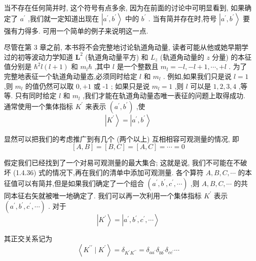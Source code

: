 \documentclass[lang=cn,newtx,10pt,scheme=chinese,thmcnt=section]{elegantbook}
\begin{document}
当不存在任何简并时, 这个符号有点多余, 因为在前面的讨论中可明显看到, 如果确定了 ${a}^{\prime }$ ,我们就一定知道出现在 $\left| {{a}^{\prime },{b}^{\prime }}\right\rangle$ 中的 ${b}^{\prime }$ . 当有简并存在时,符号 $\left| {{a}^{\prime },{b}^{\prime }}\right\rangle$ 要强有力得多. 可用一个简单的例子来说明这一点.

尽管在第 3 章之前, 本书将不会完整地讨论轨道角动量, 读者可能从他或她早期学过的初等波动力学知道 ${\mathbf{L}}^{2}$ (轨道角动量平方) 和 ${L}_{z}$ (轨道角动量的 $z$ 分量) 的本征值分别是 ${\hbar }^{2}l\left( {l + 1}\right)$ 和 ${m}_{l}\hbar$ ,其中 $l$ 是一个整数且 ${m}_{l} = - l, - l + 1,\cdots , + l$ . 为了完整地表征一个轨道角动量态,必须同时给定 $l$ 和 ${m}_{l}$ . 例如,如果我们只是说 $l = 1$ ,则 ${m}_{l}$ 的值仍然可以取 $0, + 1$ 或 -1 ; 如果只是说 ${m}_{l} = 1$ ,则 $l$ 可以是 $1,2,3,4$ ,等等. 只有同时给定 $l$ 和 ${m}_{l}$ ,我们才能在轨道角动量态唯一表征的问题上取得成功. 通常使用一个集体指标 ${K}^{\prime }$ 来表示 $\left( {{a}^{\prime },{b}^{\prime }}\right)$ ,使
\begin{equation}
	\left| {K}^{\prime }\right\rangle = \left| {{a}^{\prime },{b}^{\prime }}\right\rangle
\end{equation}

显然可以把我们的考虑推广到有几个 (两个以上) 互相相容可观测量的情况, 即
\begin{equation}
	\left\lbrack {A, B}\right\rbrack = \left\lbrack {B, C}\right\rbrack = \left\lbrack {A, C}\right\rbrack = \cdots = 0
\end{equation}

假定我们已经找到了一个对易可观测量的最大集合; 这就是说, 我们不可能在不破坏 (1.4.36) 式的情况下,再在我们的清单中添加可观测量. 各个算符 $A, B, C,\cdots$ 的本征值可以有简并,但是如果我们确定了一个组合 $\left( {{a}^{\prime },{b}^{\prime },{c}^{\prime },\cdots }\right)$ ,则 $A, B, C,\cdots$ 的共同本征右矢就被唯一地确定了. 我们可以再一次利用一个集体指标 ${K}^{\prime }$ 表示 $\left( {{a}^{\prime },{b}^{\prime },{c}^{\prime },\cdots }\right)$ . 对于
\begin{equation}
	\left| {K}^{\prime }\right\rangle = \left| {{a}^{\prime },{b}^{\prime },{c}^{\prime },\cdots }\right\rangle
\end{equation}

其正交关系记为
\begin{equation}
	\left\langle {{K}^{\prime \prime } \mid {K}^{\prime }}\right\rangle = {\delta }_{{K}^{\prime }{K}^{\prime \prime }} = {\delta }_{a{a}^{\prime }}{\delta }_{b{b}^{\prime }}{\delta }_{c{c}^{\prime }}\cdots
\end{equation}
\end{document}
